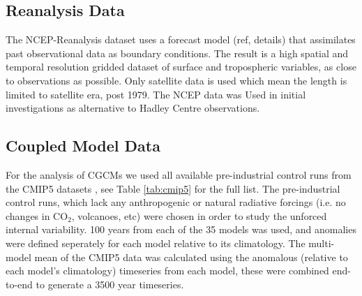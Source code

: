 \subsection{Reanalysis Data}

The NCEP-Reanalysis dataset uses a forecast model (ref, details) that 
assimilates past observational data as boundary conditions. The result is a high 
spatial and temporal resolution gridded dataset of surface and tropospheric 
variables, as close to observations as possible.  Only satellite data is used 
which mean the length is limited to satellite era, post 1979. The NCEP data was 
Used in initial investigations as alternative to Hadley Centre observations.

\subsection{Coupled Model Data}

For the analysis of CGCMs we used all available pre-industrial control runs from 
the CMIP5 datasets \citep{Taylor2012}, see Table \ref{tab:cmip5} for the full 
list. The pre-industrial control runs, which lack any anthropogenic or natural 
radiative forcings (i.e. no changes in CO$_2$, volcanoes, etc)  were chosen in 
order to study the unforced internal variability. 100 years from each of the 35 
models was used, and anomalies were defined seperately for each model relative 
to its climatology. The multi-model mean of the CMIP5 data was calculated using 
the anomalous (relative to each model’s climatology) timeseries from each model, 
these were combined end-to-end to generate a 3500 year timeseries. 


